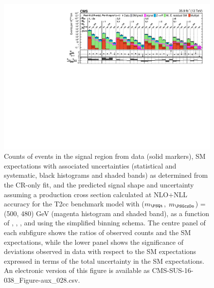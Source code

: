 \begin{figure}[p]
    \begin{center}
        \includegraphics[width=1.00\textwidth]{Supplementary/CMS-SUS-16-038_Figure-aux_028.pdf}
  \caption{Counts of events in the signal region from data (solid markers), SM expectations
    with associated uncertainties (statistical and systematic, black
    histograms and shaded bands) as determined from the CR-only fit,
    and the predicted signal shape and uncertainty assuming a production cross
    section calculated at NLO+NLL accuracy for the
        T2cc benchmark model with ($m_{\PSQt}$, $m_{\PSGczDo}$) = (500, 480) GeV
    (magenta histogram and shaded band),
    as a function of \njet, \nb, \scalht, and \mht using the simplified binning schema.
    The centre panel of each subfigure shows the ratios of
    observed counts and the SM expectations, while the lower panel
    shows the significance of deviations observed in data with respect
    to the SM expectations expressed in terms of the total uncertainty
    in the SM expectations.  
	An electronic version of this figure is available as CMS-SUS-16-038\_Figure-aux\_028.csv.
        }
        \label{fig:T2cc_500_480_MR_sig}
    \end{center}
\end{figure}

